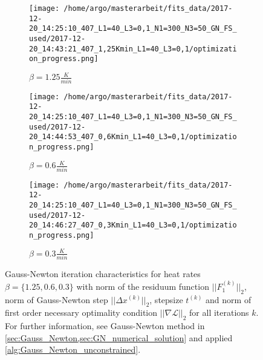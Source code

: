 \documentclass{scrartcl}[12pt, halfparskip]
\numberwithin{equation}{section}
\numberwithin{figure}{section}
\numberwithin{table}{section}
\begin{document}
\begin{figure}[H]
	\begin{subfigure}{0.49\textwidth}
		\texttt{[image: /home/argo/masterarbeit/fits\_data/2017-12-20\_14:25:10\_407\_L1=40\_L3=0,1\_N1=300\_N3=50\_GN\_FS\_used/2017-12-20\_14:43:21\_407\_1,25Kmin\_L1=40\_L3=0,1/optimization\_progress.png]}
		\caption{$\beta = 1.25 \frac{K}{min}$}
	\end{subfigure}
	\begin{subfigure}{0.49\textwidth}
		\texttt{[image: /home/argo/masterarbeit/fits\_data/2017-12-20\_14:25:10\_407\_L1=40\_L3=0,1\_N1=300\_N3=50\_GN\_FS\_used/2017-12-20\_14:44:53\_407\_0,6Kmin\_L1=40\_L3=0,1/optimization\_progress.png]}
		\caption{$\beta = 0.6 \frac{K}{min}$}
	\end{subfigure}
	\centering
	\begin{subfigure}{0.49\textwidth}
		\texttt{[image: /home/argo/masterarbeit/fits\_data/2017-12-20\_14:25:10\_407\_L1=40\_L3=0,1\_N1=300\_N3=50\_GN\_FS\_used/2017-12-20\_14:46:27\_407\_0,3Kmin\_L1=40\_L3=0,1/optimization\_progress.png]}
		\caption{$\beta = 0.3 \frac{K}{min}$}
	\end{subfigure}

	\caption{Gauss-Newton iteration characteristics for heat rates $\beta = \{ 1.25, 0.6, 0.3 \}$ with norm of the residuum function $||F_1^{(k)}||_2$, norm of Gauss-Newton step $||\Delta x^{(k)}||_2$, stepsize $t^{(k)}$ and norm of first order necessary optimality condition $|| \nabla \mathcal{L} ||_2$ for all iterations $k$.  \\
	For further information, see Gauss-Newton method in \cref{sec:Gauss_Newton,sec:GN_numerical_solution} and applied \cref{alg:Gauss_Newton_unconstrained}.}
	\label{fig:optimization_progress_FS_2}
\end{figure}
\end{document}
